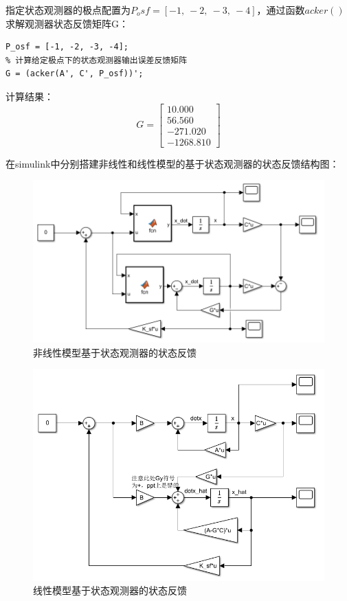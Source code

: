 \documentclass[UTF8]{article}
\begin{document}
指定状态观测器的极点配置为$P_osf = [-1,\ -2,\ -3,\ -4]$，通过函数$acker()$求解观测器状态反馈矩阵G：
\begin{lstlisting}
P_osf = [-1, -2, -3, -4];
% 计算给定极点下的状态观测器输出误差反馈矩阵
G = (acker(A', C', P_osf))';
\end{lstlisting}
计算结果：
\begin{equation*}
	G = \begin{bmatrix}
		10.000 \\
		56.560 \\
		-271.020 \\
		-1268.810
	\end{bmatrix}
\end{equation*}

在simulink中分别搭建非线性和线性模型的基于状态观测器的状态反馈结构图：
\begin{figure}[H]
    \centering %
    \includegraphics[width=.6\textwidth]{figure/倒立摆-非线性模型-状态观测器.png} 
    \caption{非线性模型基于状态观测器的状态反馈} %
\end{figure}
\begin{figure}[H]
    \centering %
    \includegraphics[width=.6\textwidth]{figure/倒立摆-线性模型-状态观测器.png} 
    \caption{线性模型基于状态观测器的状态反馈} %
\end{figure}
\end{document}
